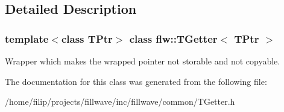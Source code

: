 \subsection{Detailed Description}
\subsubsection*{template$<$class T\+Ptr$>$\newline
class flw\+::\+T\+Getter$<$ T\+Ptr $>$}

Wrapper which makes the wrapped pointer not storable and not copyable. 

The documentation for this class was generated from the following file\+:\begin{DoxyCompactItemize}
\item 
/home/filip/projects/fillwave/inc/fillwave/common/T\+Getter.\+h\end{DoxyCompactItemize}
